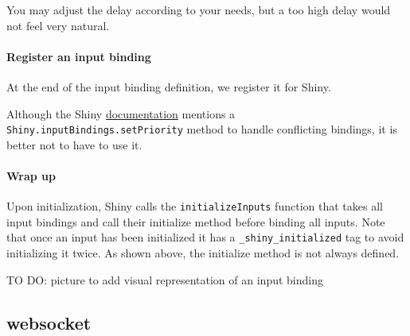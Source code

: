 \documentclass[]{book}
\newenvironment{Shaded}{\begin{snugshade}}{\end{snugshade}}
\newcommand{\AttributeTok}[1]{\textcolor[rgb]{0.77,0.63,0.00}{#1}}
\newcommand{\CommentTok}[1]{\textcolor[rgb]{0.56,0.35,0.01}{\textit{#1}}}
\newcommand{\KeywordTok}[1]{\textcolor[rgb]{0.13,0.29,0.53}{\textbf{#1}}}
\newcommand{\NormalTok}[1]{#1}
\newcommand{\OperatorTok}[1]{\textcolor[rgb]{0.81,0.36,0.00}{\textbf{#1}}}
\newcommand{\StringTok}[1]{\textcolor[rgb]{0.31,0.60,0.02}{#1}}
\newcommand{\VariableTok}[1]{\textcolor[rgb]{0.00,0.00,0.00}{#1}}
\let\oldparagraph\paragraph
\renewcommand{\paragraph}[1]{\oldparagraph{#1}\mbox{}}
\begin{document}
You may adjust the delay according to your needs, but a too high delay would not feel very natural.

\hypertarget{register-an-input-binding}{%
\paragraph{Register an input binding}\label{register-an-input-binding}}

At the end of the input binding definition, we register it for Shiny.

\begin{Shaded}
\end{Shaded}

Although the Shiny \href{https://shiny.rstudio.com/articles/building-inputs.html}{documentation} mentions a \texttt{Shiny.inputBindings.setPriority} method to handle conflicting bindings, it is better not to have to use it.

\hypertarget{wrap-up}{%
\paragraph{Wrap up}\label{wrap-up}}

Upon initialization, Shiny calls the \texttt{initializeInputs} function that takes all input bindings and call their initialize method before binding all inputs. Note that once an input has been initialized it has a \texttt{\_shiny\_initialized} tag to avoid initializing it twice. As shown above, the initialize method is not always defined.

TO DO: picture to add visual representation of an input binding

\hypertarget{websocket}{%
\subsection{websocket}\label{websocket}}
\end{document}
